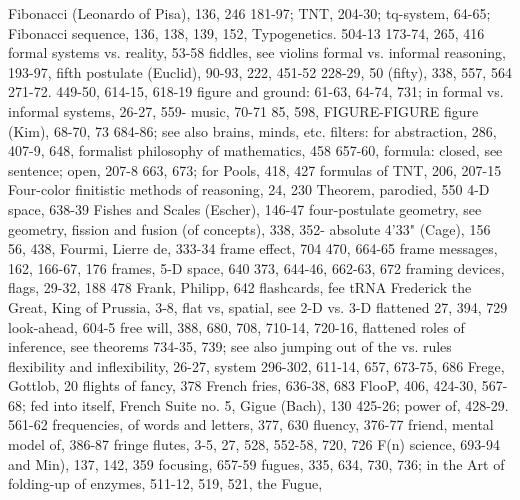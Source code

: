 Fibonacci (Leonardo of Pisa), 136, 246            181-97; TNT, 204-30; tq-system, 64-65;
Fibonacci sequence, 136, 138, 139, 152,           Typogenetics. 504-13
173-74, 265, 416                                  formal systems vs. reality, 53-58
fiddles, see violins                              formal vs. informal reasoning, 193-97,
fifth postulate (Euclid), 90-93, 222, 451-52      228-29,
50 (fifty), 338, 557, 564                         271-72. 449-50, 614-15, 618-19
figure and ground: 61-63, 64-74, 731; in          formal vs. informal systems, 26-27, 559-
music, 70-71                                      85, 598,
FIGURE-FIGURE figure (Kim), 68-70, 73             684-86; see also brains, minds, etc.
filters: for abstraction, 286, 407-9, 648,        formalist philosophy of mathematics, 458
657-60,                                           formula: closed, see sentence; open, 207-8
663, 673; for Pools, 418, 427                     formulas of TNT, 206, 207-15 Four-color
finitistic methods of reasoning, 24, 230          Theorem, parodied, 550 4-D space, 638-39
Fishes and Scales (Escher), 146-47                four-postulate geometry, see geometry,
fission and fusion (of concepts), 338, 352-       absolute 4'33" (Cage), 156
56, 438,                                          Fourmi, Lierre de, 333-34 frame effect, 704
470, 664-65                                       frame messages, 162, 166-67, 176 frames,
5-D space, 640                                    373, 644-46, 662-63, 672 framing devices,
flags, 29-32, 188                                 478 Frank, Philipp, 642
flashcards, fee tRNA                              Frederick the Great, King of Prussia, 3-8,
flat vs, spatial, see 2-D vs. 3-D flattened       27, 394, 729
look-ahead, 604-5                                 free will, 388, 680, 708, 710-14, 720-16,
flattened roles of inference, see theorems        734-35, 739; see also jumping out of the
vs. rules flexibility and inflexibility, 26-27,   system
296-302, 611-14, 657, 673-75, 686                 Frege, Gottlob, 20
flights of fancy, 378                             French fries, 636-38, 683
FlooP, 406, 424-30, 567-68; fed into itself,      French Suite no. 5, Gigue (Bach), 130
425-26; power of, 428-29. 561-62                  frequencies, of words and letters, 377, 630
fluency, 376-77                                   friend, mental model of, 386-87 fringe
flutes, 3-5, 27, 528, 552-58, 720, 726 F(n)       science, 693-94
and Min), 137, 142, 359 focusing, 657-59          fugues, 335, 634, 730, 736; in the Art of
folding-up of enzymes, 511-12, 519, 521,          the Fugue,
